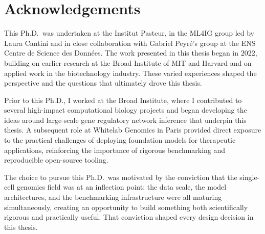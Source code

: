 \raggedbottom %

\chapter*{Acknowledgements}

This Ph.D.\ was undertaken at the Institut Pasteur, in the ML4IG group led by Laura Cantini and in close collaboration with Gabriel Peyré's group at the ENS Centre de Science des Données. The work presented in this thesis began in 2022, building on earlier research at the Broad Institute of MIT and Harvard and on applied work in the biotechnology industry. These varied experiences shaped the perspective and the questions that ultimately drove this thesis.

\bigskip

Prior to this Ph.D., I worked at the Broad Institute, where I contributed to several high-impact computational biology projects and began developing the ideas around large-scale gene regulatory network inference that underpin this thesis. A subsequent role at Whitelab Genomics in Paris provided direct exposure to the practical challenges of deploying foundation models for therapeutic applications, reinforcing the importance of rigorous benchmarking and reproducible open-source tooling.

\bigskip

The choice to pursue this Ph.D.\ was motivated by the conviction that the single-cell genomics field was at an inflection point: the data scale, the model architectures, and the benchmarking infrastructure were all maturing simultaneously, creating an opportunity to build something both scientifically rigorous and practically useful. That conviction shaped every design decision in this thesis.
